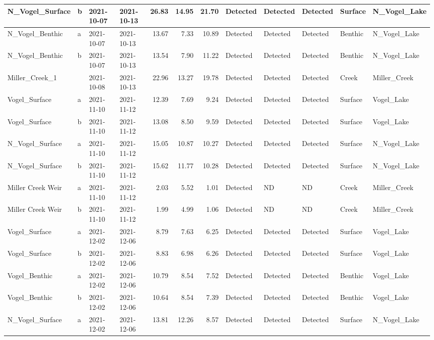 \documentclass[
]{book}
\begin{document}
\begin{table}
\begin{tabular}[t]{l|l|l|l|r|r|r|l|l|l|l|l}
\hline
N\_Vogel\_Surface & b & 2021-10-07 & 2021-10-13 & 26.83 & 14.95 & 21.70 & Detected & Detected & Detected & Surface & N\_Vogel\_Lake\\
\hline
N\_Vogel\_Benthic & a & 2021-10-07 & 2021-10-13 & 13.67 & 7.33 & 10.89 & Detected & Detected & Detected & Benthic & N\_Vogel\_Lake\\
\hline
N\_Vogel\_Benthic & b & 2021-10-07 & 2021-10-13 & 13.54 & 7.90 & 11.22 & Detected & Detected & Detected & Benthic & N\_Vogel\_Lake\\
\hline
Miller\_Creek\_1 &  & 2021-10-08 & 2021-10-13 & 22.96 & 13.27 & 19.78 & Detected & Detected & Detected & Creek & Miller\_Creek\\
\hline
Vogel\_Surface & a & 2021-11-10 & 2021-11-12 & 12.39 & 7.69 & 9.24 & Detected & Detected & Detected & Surface & Vogel\_Lake\\
\hline
Vogel\_Surface & b & 2021-11-10 & 2021-11-12 & 13.08 & 8.50 & 9.59 & Detected & Detected & Detected & Surface & Vogel\_Lake\\
\hline
N\_Vogel\_Surface & a & 2021-11-10 & 2021-11-12 & 15.05 & 10.87 & 10.27 & Detected & Detected & Detected & Surface & N\_Vogel\_Lake\\
\hline
N\_Vogel\_Surface & b & 2021-11-10 & 2021-11-12 & 15.62 & 11.77 & 10.28 & Detected & Detected & Detected & Surface & N\_Vogel\_Lake\\
\hline
Miller Creek Weir & a & 2021-11-10 & 2021-11-12 & 2.03 & 5.52 & 1.01 & Detected & ND & ND & Creek & Miller\_Creek\\
\hline
Miller Creek Weir & b & 2021-11-10 & 2021-11-12 & 1.99 & 4.99 & 1.06 & Detected & ND & ND & Creek & Miller\_Creek\\
\hline
Vogel\_Surface & a & 2021-12-02 & 2021-12-06 & 8.79 & 7.63 & 6.25 & Detected & Detected & Detected & Surface & Vogel\_Lake\\
\hline
Vogel\_Surface & b & 2021-12-02 & 2021-12-06 & 8.83 & 6.98 & 6.26 & Detected & Detected & Detected & Surface & Vogel\_Lake\\
\hline
Vogel\_Benthic & a & 2021-12-02 & 2021-12-06 & 10.79 & 8.54 & 7.52 & Detected & Detected & Detected & Benthic & Vogel\_Lake\\
\hline
Vogel\_Benthic & b & 2021-12-02 & 2021-12-06 & 10.64 & 8.54 & 7.39 & Detected & Detected & Detected & Benthic & Vogel\_Lake\\
\hline
N\_Vogel\_Surface & a & 2021-12-02 & 2021-12-06 & 13.81 & 12.26 & 8.57 & Detected & Detected & Detected & Surface & N\_Vogel\_Lake\\

\end{tabular}
\end{table}
\end{document}
